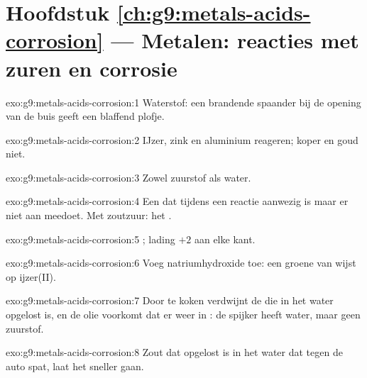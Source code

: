 \section*{Hoofdstuk \ref{ch:g9:metals-acids-corrosion} --- Metalen: reacties met zuren en corrosie}

\begin{solution}{exo:g9:metals-acids-corrosion:1}
Waterstof: een brandende spaander bij de opening van de buis geeft een
blaffend plofje.
\end{solution}

\begin{solution}{exo:g9:metals-acids-corrosion:2}
IJzer, zink en aluminium reageren; koper en goud niet.
\end{solution}

\begin{solution}{exo:g9:metals-acids-corrosion:3}
Zowel zuurstof als water.
\end{solution}

\begin{solution}{exo:g9:metals-acids-corrosion:4}
Een  dat tijdens een reactie aanwezig is maar er niet aan meedoet.
Met zoutzuur: het  .
\end{solution}

\begin{solution}{exo:g9:metals-acids-corrosion:5}
; lading $+2$ aan elke kant.
\end{solution}

\begin{solution}{exo:g9:metals-acids-corrosion:6}
Voeg natriumhydroxide toe: een groene  van  wijst op
ijzer(II).
\end{solution}

\begin{solution}{exo:g9:metals-acids-corrosion:7}
Door te koken verdwijnt de  die in het water opgelost is, en de
olie voorkomt dat er weer  in : de spijker heeft water, maar
geen zuurstof.
\end{solution}

\begin{solution}{exo:g9:metals-acids-corrosion:8}
Zout dat opgelost is in het water dat tegen de auto spat, laat het
 sneller gaan.
\end{solution}

